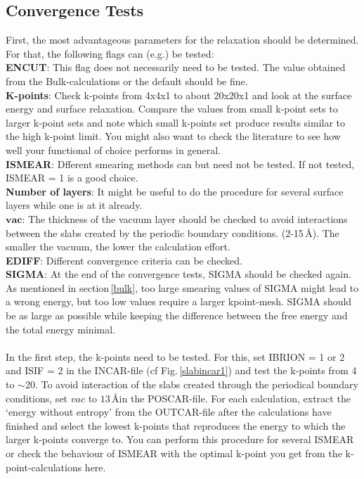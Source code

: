 \documentclass[twoside, 11pt, titlepage, captions=nooneline, a4paper, headsepline]{scrbook}%
\newcommand{\9}{\mathrm}
\newcommand{\0}{\,\mathrm}
\begin{document}
\subsection{Convergence Tests}
First, the most advantageous parameters for the relaxation should be determined. For that, the following flags can (e.g.) be tested:\\
\textbf{ENCUT}: This flag does not necessarily need to be tested. The value obtained from the Bulk-calculations or the default should be fine.\\
\textbf{K-points}: Check k-points from 4x4x1 to about 20x20x1 and look at the surface energy and surface relaxation. Compare the values from small k-point sets to larger k-point sets and note which small k-points set produce results similar to the high k-point limit. You might also want to check the literature to see how well your functional of choice performs in general.\\
\textbf{ISMEAR}: Dfferent smearing methods can but need not be tested. If not tested, ISMEAR = 1 is a good choice.\\
\textbf{Number of layers}: It might be useful to do the procedure for several surface layers while one is at it already.\\
$\textbf{vac}$: The thickness of the vacuum layer should be checked to avoid interactions between the slabs created by the periodic boundary conditions. (2-15\,\AA). The smaller the vacuum, the lower the calculation effort.\\
\textbf{EDIFF}: Different convergence criteria can be checked.\\
\textbf{SIGMA}: At the end of the convergence tests, SIGMA should be checked again. As mentioned in section\,\ref{bulk}, too large smearing values of SIGMA might lead to a wrong energy, but too low values require a larger kpoint-mesh. SIGMA should be as large as possible while keeping the difference between the free energy and the total energy minimal.\\
\\
In the first step, the k-points need to be tested. For this, set IBRION = 1 or 2 and ISIF = 2 in the INCAR-file (cf Fig.\,\ref{slabincar1}) and test the k-points from 4 to $\sim$20. To avoid interaction of the slabs created through the periodical boundary conditions, set $vac$ to $ 13 $\,\AA in the POSCAR-file.
For each calculation, extract the `energy without entropy' from the OUTCAR-file after the calculations have finished and select the lowest k-points that reproduces the energy to which the larger k-points converge to. You can perform this procedure for several ISMEAR or check the behaviour of ISMEAR with the optimal k-point you get from the k-point-calculations here.
\end{document}
